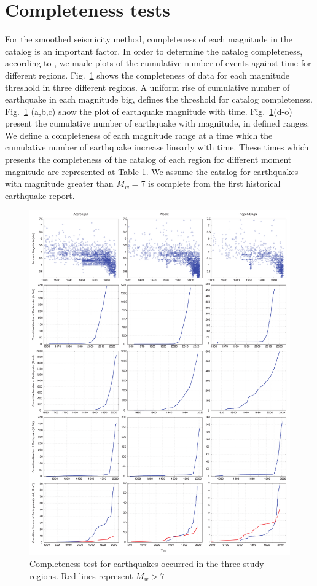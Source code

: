 \section{Completeness tests}
For the smoothed seismicity method, completeness of each magnitude in the catalog is an important factor. In order to determine the catalog completeness, according to \citet{Frankel1995}, we made plots of the cumulative number of events against time for different regions.   Fig.~\ref{fig:comptest} shows the completeness of data for each magnitude threshold in three different regions.
A uniform rise of cumulative number of earthquake in each magnitude big, defines the threshold for catalog completeness. Fig.~\ref{fig:comptest} (a,b,c) show the plot of earthquake magnitude with time. Fig.~\ref{fig:comptest}(d-o) present the cumulative number of earthquake with magnitude, in defined ranges. We define a completeness of each magnitude range at a time which the cumulative number of earthquake increase linearly with time. These times which presents the completeness of the catalog of each region for different moment magnitude are represented at Table 1. We assume the catalog for earthquakes with magnitude greater than $M_w=7$ is complete from the first historical earthquake report. 

\begin{figure} [H]
\centering
\includegraphics[scale=0.3]{figures/pdf/Figure4.pdf} 
\caption{Completeness test for earthquakes occurred in the three study regions. Red lines represent $M_w > 7$ }
\label{fig:comptest}
\end{figure}



